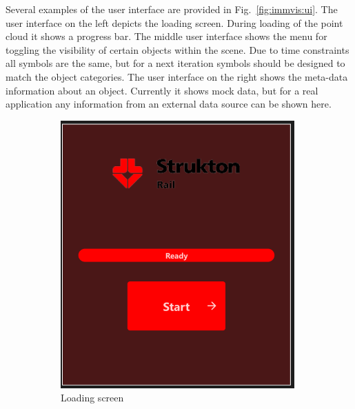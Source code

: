 Several examples of the user interface are provided in Fig.~\ref{fig:immvis:ui}. The user interface on the left depicts the loading screen. During loading of the point cloud it shows a progress bar. The middle user interface shows the menu for toggling the visibility of certain objects within the scene. Due to time constraints all symbols are the same, but for a next iteration symbols should be designed to match the object categories. The user interface on the right shows the meta-data information about an object. Currently it shows mock data, but for a real application any information from an external data source can be shown here.

\begin{figure}[!ht]
    \centering
    \begin{subfigure}{0.3\textwidth}
        \includegraphics[width=\textwidth]{./Chapters/immvis/figs/Strukton_load.png}
        \caption{Loading screen}
    \end{subfigure}%
    \hfill
    \begin{subfigure}{0.3\textwidth}

\end{subfigure}
\end{figure}
